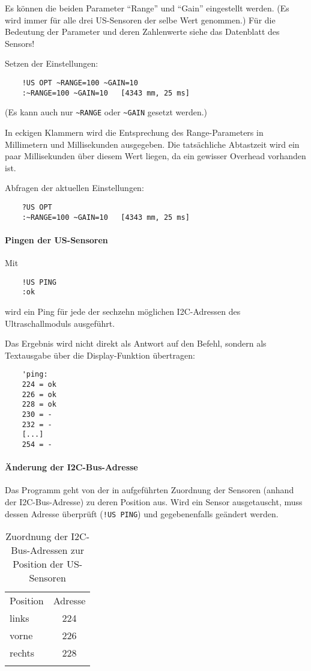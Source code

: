 Es können die beiden Parameter "`Range"' und "`Gain"' eingestellt werden. (Es wird immer für alle drei US-Sensoren der selbe Wert genommen.) Für die Bedeutung der Parameter und deren Zahlenwerte siehe das Datenblatt des Sensors!

Setzen der Einstellungen:
\begin{verbatim}
	!US OPT ~RANGE=100 ~GAIN=10
	:~RANGE=100 ~GAIN=10   [4343 mm, 25 ms]
\end{verbatim}
(Es kann auch nur \verb|~RANGE| oder \verb|~GAIN| gesetzt werden.)

In eckigen Klammern wird die Entsprechung des Range-Parameters in Millimetern und Millisekunden ausgegeben. Die tatsächliche Abtastzeit wird ein paar Millisekunden über diesem Wert liegen, da ein gewisser Overhead vorhanden ist.

Abfragen der aktuellen Einstellungen:
\begin{verbatim}
	?US OPT
	:~RANGE=100 ~GAIN=10   [4343 mm, 25 ms]
\end{verbatim}



\paragraph{Pingen der US-Sensoren}

Mit 
\begin{verbatim}
	!US PING
	:ok
\end{verbatim}
wird ein Ping für jede der sechzehn möglichen I2C-Adressen des Ultraschallmoduls ausgeführt.

Das Ergebnis wird nicht direkt als Antwort auf den Befehl, sondern als Textausgabe über die Display-Funktion übertragen: 
\begin{verbatim}
	'ping:
	224 = ok
	226 = ok
	228 = ok
	230 = -
	232 = -
	[...]
	254 = -
\end{verbatim}


\paragraph{Änderung der I2C-Bus-Adresse}

Das Programm geht von der in  aufgeführten Zuordnung der Sensoren (anhand der I2C-Bus-Adresse) zu deren Position aus. Wird ein Sensor ausgetauscht, muss dessen Adresse überprüft (\verb|!US PING|) und gegebenenfalls geändert werden.

\begin{table}[htb]%
	\centering
	\caption{Zuordnung der I2C-Bus-Adressen zur Position der US-Sensoren}
	\label{tab:usaddresses}
	\begin{tabular}{lc}
		\mytoprule
		Position & Adresse \\
		\mymidrule
		links & 224 \\
		vorne & 226 \\
		rechts & 228 \\
		\mybottomrule
	\end{tabular}
\end{table}

